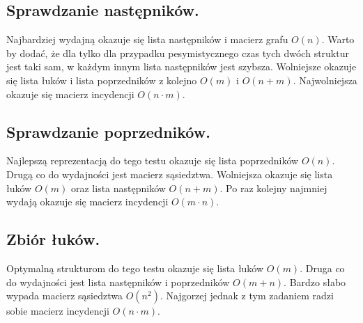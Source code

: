 \documentclass[polish,polish,a4paper]{article}
\begin{document}
\begin{spacing}{1.25}
\subsection{Sprawdzanie następników.}
Najbardziej wydajną okazuje się lista następników i macierz grafu $ O(n) $. Warto by dodać, że dla tylko dla przypadku pesymistycznego czas tych dwóch struktur jest taki sam, w każdym innym lista następników jest szybsza. Wolniejsze okazuje się lista łuków i lista poprzedników z kolejno $ O(m) $ i $ O(n+m) $. Najwolniejsza okazuje się macierz incydencji $ O(n \cdot m) $.

\subsection{Sprawdzanie poprzedników.}
Najlepszą reprezentacją do tego testu okazuje się lista poprzedników $ O(n) $. Drugą co do wydajności jest macierz sąsiedztwa. Wolniejsza okazuje się lista łuków $ O(m) $ oraz lista następników $ O(n+m) $. Po raz kolejny najmniej wydają okazuje się macierz incydencji $ O(m \cdot n) $.

\subsection{Zbiór łuków.}
Optymalną strukturom do tego testu okazuje się lista łuków $ O(m) $.  Druga co do  wydajności jest lista następników i poprzedników $ O(m+n) $. Bardzo słabo wypada macierz sąsiedztwa $ O(n^2) $. Najgorzej jednak z tym zadaniem radzi sobie macierz incydencji $ O(n \cdot m) $.


\end{spacing}
	\newpage
	\tableofcontents
\end{document}
